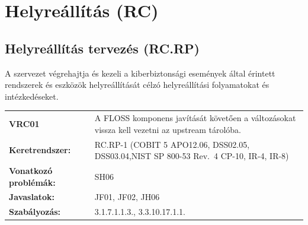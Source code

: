 \documentclass[12pt,magyar,a4paper,oneside]{scrreprt}
\begin{document}
\hypertarget{helyreuxe1lluxedtuxe1s-rc}{%
\section{Helyreállítás (RC)}\label{helyreuxe1lluxedtuxe1s-rc}}

\hypertarget{helyreuxe1lluxedtuxe1s-tervezuxe9s-rc.rp}{%
\subsection{Helyreállítás tervezés
(RC.RP)}\label{helyreuxe1lluxedtuxe1s-tervezuxe9s-rc.rp}}

A szervezet végrehajtja és kezeli a kiberbiztonsági események által
érintett rendszerek és eszközök helyreállítását célzó helyreállítási
folyamatokat és intézkedéseket.

\begin{longtable}[]{@{}ll@{}}
\toprule
\endhead
\begin{minipage}[t]{0.16\columnwidth}\raggedright
\textbf{VRC01}\strut
\end{minipage} & \begin{minipage}[t]{0.79\columnwidth}\raggedright
A FLOSS komponens javítását követően a változásokat vissza kell vezetni
az upstream tárolóba.\strut
\end{minipage}\tabularnewline
\begin{minipage}[t]{0.16\columnwidth}\raggedright
\textbf{Keretrendszer:}\strut
\end{minipage} & \begin{minipage}[t]{0.79\columnwidth}\raggedright
RC.RP-1 (COBIT 5 APO12.06, DSS02.05, DSS03.04,NIST SP 800-53 Rev.~4
CP-10, IR-4, IR-8)\strut
\end{minipage}\tabularnewline
\begin{minipage}[t]{0.16\columnwidth}\raggedright
\textbf{Vonatkozó problémák:}\strut
\end{minipage} & \begin{minipage}[t]{0.79\columnwidth}\raggedright
SH06\strut
\end{minipage}\tabularnewline
\begin{minipage}[t]{0.16\columnwidth}\raggedright
\textbf{Javaslatok:}\strut
\end{minipage} & \begin{minipage}[t]{0.79\columnwidth}\raggedright
JF01, JF02, JH06\strut
\end{minipage}\tabularnewline
\begin{minipage}[t]{0.16\columnwidth}\raggedright
\textbf{Szabályozás:}\strut
\end{minipage} & \begin{minipage}[t]{0.79\columnwidth}\raggedright
3.1.7.1.1.3., 3.3.10.17.1.1.\strut
\end{minipage}\tabularnewline
\bottomrule
\end{longtable}
\end{document}
